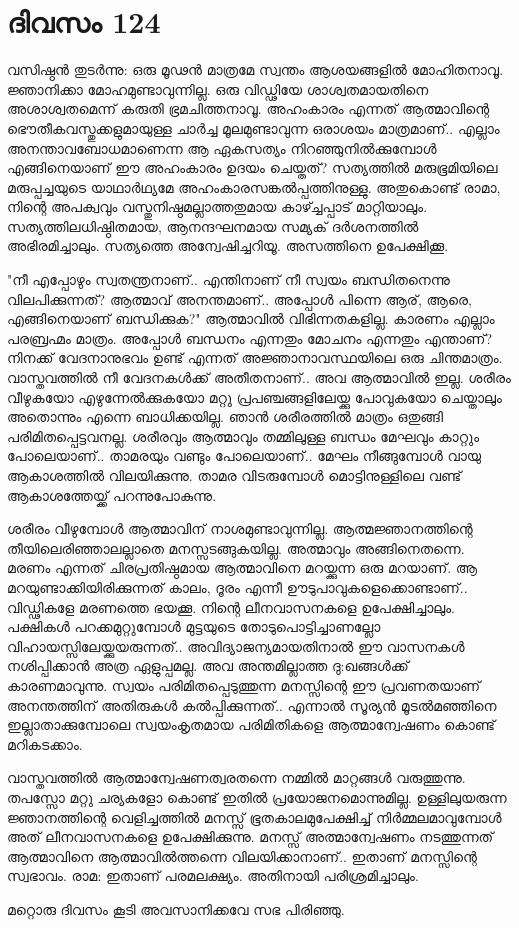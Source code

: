  
\section{ദിവസം 124}


വസിഷ്ഠന്‍ തുടര്‍ന്നു: ഒരു മൂഢന്‍ മാത്രമേ സ്വന്തം ആശയങ്ങളില്‍ മോഹിതനാവൂ. ജ്ഞാനിക്കാ മോഹമുണ്ടാവുന്നില്ല. ഒരു വിഡ്ഢിയേ ശാശ്വതമായതിനെ അശാശ്വതമെന്ന് കരുതി ഭ്രമചിത്തനാവൂ. അഹംകാരം എന്നത്‌ ആത്മാവിന്റെ ഭൌതീകവസ്തുക്കളുമായുള്ള ചാര്‍ച്ച മൂലമുണ്ടാവുന്ന ഒരാശയം മാത്രമാണ്‌.. എല്ലാം അനന്താവബോധമാണെന്ന ആ ഏകസത്യം നിറഞ്ഞുനില്‍ക്കുമ്പോള്‍ എങ്ങിനെയാണ്‌ ഈ അഹംകാരം ഉദയം ചെയ്തത്‌? സത്യത്തില്‍ മരുഭൂമിയിലെ മരുപ്പച്ചയുടെ യാഥാര്‍ഥ്യമേ അഹംകാരസങ്കല്‍പ്പത്തിനുള്ളു. അതുകൊണ്ട്‌ രാമാ, നിന്റെ അപക്വവും വസ്തുനിഷ്ഠമല്ലാത്തതുമായ കാഴ്ച്ചപ്പാട്‌ മാറ്റിയാലും. സത്യത്തിലധിഷ്ഠിതമായ, ആനന്ദഘനമായ സമ്യക്‌ ദര്‍ശനത്തില്‍ അഭിരമിച്ചാലും. സത്യത്തെ അന്വേഷിച്ചറിയൂ. അസത്തിനെ ഉപേക്ഷിക്കൂ.

"നീ എപ്പോഴും സ്വതന്ത്രനാണ്‌.. എന്തിനാണ്‌ നീ സ്വയം ബന്ധിതനെന്നു വിലപിക്കുന്നത്‌? ആത്മാവ്‌ അനന്തമാണ്‌.. അപ്പോള്‍ പിന്നെ ആര്‌, ആരെ, എങ്ങിനെയാണ്‌ ബന്ധിക്കുക?" ആത്മാവില്‍ വിഭിന്നതകളില്ല. കാരണം എല്ലാം പരബ്രഹ്മം മാത്രം. അപ്പോള്‍ ബന്ധനം എന്നതും മോചനം എന്നതും എന്താണ്‌? നിനക്ക്‌ വേദനാനുഭവം ഉണ്ട്‌ എന്നത്‌ അജ്ഞാനാവസ്ഥയിലെ ഒരു ചിന്തമാത്രം. വാസ്തവത്തില്‍ നീ വേദനകള്‍ക്ക്‌ അതീതനാണ്‌.. അവ ആത്മാവില്‍ ഇല്ല. ശരീരം വീഴുകയോ എഴുന്നേല്‍ക്കുകയോ മറ്റു പ്രപഞ്ചങ്ങളിലേയ്ക്കു പോവുകയോ ചെയ്താലും അതൊന്നും എന്നെ ബാധിക്കയില്ല. ഞാന്‍ ശരീരത്തില്‍ മാത്രം ഒതുങ്ങി പരിമിതപ്പെട്ടവനല്ല. ശരീരവും ആത്മാവും തമ്മിലുള്ള ബന്ധം മേഘവും കാറ്റും പോലെയാണ്‌.. താമരയും വണ്ടും പോലെയാണ്‌.. മേഘം നീങ്ങുമ്പോള്‍ വായു ആകാശത്തില്‍ വിലയിക്കുന്നു. താമര വിടരുമ്പോള്‍ മൊട്ടിനുള്ളിലെ വണ്ട്‌ ആകാശത്തേയ്ക്ക്‌ പറന്നുപോകുന്നു.

ശരീരം വീഴുമ്പോള്‍ ആത്മാവിന്‌ നാശമുണ്ടാവുന്നില്ല. ആത്മജ്ഞാനത്തിന്റെ തീയിലെരിഞ്ഞാലല്ലാതെ മനസ്സടങ്ങുകയില്ല. അത്മാവും അങ്ങിനെതന്നെ. മരണം എന്നത്‌ ചിരപ്രതിഷ്ഠമായ ആത്മാവിനെ മറയ്ക്കുന്ന ഒരു മറയാണ്‌. ആ മറയുണ്ടാക്കിയിരിക്കുന്നത്‌ കാലം, ദൂരം എന്നീ ഊടുപാവുകളെക്കൊണ്ടാണ്‌.. വിഡ്ഢികളേ മരണത്തെ ഭയക്കൂ. നിന്റെ ലീനവാസനകളെ ഉപേക്ഷിച്ചാലും. പക്ഷികള്‍ പറക്കമുറ്റുമ്പോള്‍ മുട്ടയുടെ തോടുപൊട്ടിച്ചാണല്ലോ വിഹായസ്സിലേയ്ക്കുയരുന്നത്‌.. അവിദ്യാജന്യമായതിനാല്‍ ഈ വാസനകള്‍ നശിപ്പിക്കാന്‍ അത്ര ഏളുപ്പമല്ല. അവ അന്തമില്ലാത്ത ദു:ഖങ്ങള്‍ക്ക്‌ കാരണമാവുന്നു. സ്വയം പരിമിതപ്പെടുത്തുന്ന മനസ്സിന്റെ ഈ പ്രവണതയാണ്‌ അനന്തത്തിന്‌ അതിരുകള്‍ കല്‍പ്പിക്കുന്നത്‌.. എന്നാല്‍ സൂര്യന്‍ മൂടല്‍മഞ്ഞിനെ ഇല്ലാതാക്കുമ്പോലെ സ്വയംകൃതമായ പരിമിതികളെ ആത്മാന്വേഷണം കൊണ്ട്‌ മറികടക്കാം.

വാസ്തവത്തില്‍ ആത്മാന്വേഷണത്വരതന്നെ നമ്മില്‍ മാറ്റങ്ങള്‍ വരുത്തുന്നു. തപസ്സോ മറ്റു ചര്യകളോ കൊണ്ട്‌ ഇതില്‍ പ്രയോജനമൊന്നുമില്ല. ഉള്ളിലുയരുന്ന ജ്ഞാനത്തിന്റെ വെളിച്ചത്തില്‍ മനസ്സ്‌ ഭൂതകാലമുപേക്ഷിച്ച്‌ നിര്‍മ്മലമാവുമ്പോള്‍ അത്‌ ലീനവാസനകളെ ഉപേക്ഷിക്കുന്നു. മനസ്സ്‌ അത്മാന്വേഷണം നടത്തുന്നത്‌ ആത്മാവിനെ ആത്മാവില്‍ത്തന്നെ വിലയിക്കാനാണ്‌.. ഇതാണ്‌ മനസ്സിന്റെ സ്വഭാവം. രാമ: ഇതാണ്‌ പരമലക്ഷ്യം. അതിനായി പരിശ്രമിച്ചാലും.

മറ്റൊരു ദിവസം കൂടി അവസാനിക്കവേ സഭ പിരിഞ്ഞു. 
